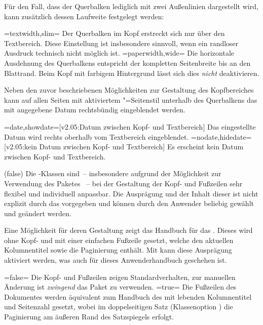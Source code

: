 \begin{DeclareEntity*}{}
\begin{DeclareEntity*}{}
\begin{DeclareEntity*}{}
\begin{Declaration}
Für den Fall, dass der Querbalken lediglich mit zwei Außenlinien dargestellt 
wird, kann zusätzlich dessen Laufweite festgelegt werden:
\begin{DeclareValues}
\itemval=textwidth,slim=
  Der Querbalken im Kopf erstreckt sich nur über den Textbereich. Diese 
  Einstellung ist insbesondere sinnvoll, wenn ein randloser Ausdruck technisch 
  nicht möglich ist. 
\itemval=paperwidth,wide=
  Die horizontale Ausdehnung des Querbalkens entspricht der kompletten 
  Seitenbreite bis an den Blattrand. Beim Kopf mit farbigem Hintergrund lässt 
  sich dies \emph{nicht} deaktivieren.
\end{DeclareValues}

Neben den zuvor beschriebenen Möglichkeiten zur Gestaltung des Kopfbereiches 
kann auf allen Seiten mit aktiviertem "=Seitenstil 
unterhalb des Querbalkens das mit  angegebene Datum rechtsbündig 
eingeblendet werden.%
%
\begin{DeclareValues}
\itemval=date,showdate=[v2.05:Datum zwischen Kopf- und Textbereich]
  Das eingestellte Datum wird rechts oberhalb vom Textbereich eingeblendet.
\itemval=nodate,hidedate=[v2.05:kein Datum zwischen Kopf- und Textbereich]
  Es erscheint kein Datum zwischen Kopf- und Textbereich.
\end{DeclareValues}
%
\end{Declaration}

\begin{Declaration}
  {}
  (false)%
Die \TUDScript-Klassen sind~-- insbesondere aufgrund der Möglichkeit zur 
Verwendung des Paketes ~-- bei der Gestaltung der 
Kopf- und Fußzeilen sehr flexibel und individuell anpassbar. Die Ausprägung und 
der Inhalt dieser ist nicht explizit durch das \CD vorgegeben und können durch 
den Anwender beliebig gewählt und geändert werden. 

Eine Möglichkeit für deren Gestaltung zeigt das Handbuch für das \TUDCD. Dieses 
wird ohne Kopf- und mit einer einfachen Fußzeile gesetzt, welche den aktuellen 
Kolumnentitel sowie die Paginierung enthält. Mit  kann diese 
Ausprägung aktiviert werden, was auch für dieses Anwenderhandbuch geschehen ist.
\begin{DeclareValues}
\itemval=false=
  Die Kopf- und Fußzeilen zeigen Standardverhalten, zur manuellen Änderung 
  ist \emph{zwingend} das Paket  zu verwenden.
\itemval*=true=
  Die Fußzeilen des Dokumentes werden äquivalent zum Handbuch des \TUDCDs mit 
  lebenden Kolumnentitel und Seitenzahl gesetzt, wobei im doppelseitigen Satz 
  (Klassenoption ) die Paginierung am äußeren Rand des 
  Satzspiegels erfolgt.
\end{DeclareValues}


\end{Declaration}
\end{DeclareEntity*}
\end{DeclareEntity*}
\end{DeclareEntity*}
